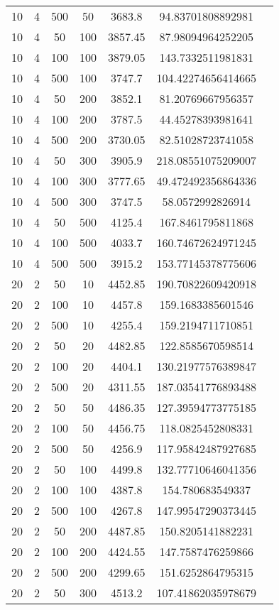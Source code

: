 {\begin{longtabu}{S
S
S
S
S
S[round-mode=places,round-precision=0]
S[round-mode=places,round-precision=0]}
10 & 4 & 500 & 50 & 3683.8 & 94.83701808892981 \\
10 & 4 & 50 & 100 & 3857.45 & 87.98094964252205 \\
10 & 4 & 100 & 100 & 3879.05 & 143.7332511981831 \\
10 & 4 & 500 & 100 & 3747.7 & 104.42274656414665 \\
10 & 4 & 50 & 200 & 3852.1 & 81.20769667956357 \\
10 & 4 & 100 & 200 & 3787.5 & 44.45278393981641 \\
10 & 4 & 500 & 200 & 3730.05 & 82.51028723741058 \\
10 & 4 & 50 & 300 & 3905.9 & 218.08551075209007 \\
10 & 4 & 100 & 300 & 3777.65 & 49.472492356864336 \\
10 & 4 & 500 & 300 & 3747.5 & 58.0572992826914 \\
10 & 4 & 50 & 500 & 4125.4 & 167.8461795811868 \\
10 & 4 & 100 & 500 & 4033.7 & 160.74672624971245 \\
10 & 4 & 500 & 500 & 3915.2 & 153.77145378775606 \\
20 & 2 & 50 & 10 & 4452.85 & 190.70822609420918 \\
20 & 2 & 100 & 10 & 4457.8 & 159.1683385601546 \\
20 & 2 & 500 & 10 & 4255.4 & 159.2194711710851 \\
20 & 2 & 50 & 20 & 4482.85 & 122.8585670598514 \\
20 & 2 & 100 & 20 & 4404.1 & 130.21977576389847 \\
20 & 2 & 500 & 20 & 4311.55 & 187.03541776893488 \\
20 & 2 & 50 & 50 & 4486.35 & 127.39594773775185 \\
20 & 2 & 100 & 50 & 4456.75 & 118.0825452808331 \\
20 & 2 & 500 & 50 & 4256.9 & 117.95842487927685 \\
20 & 2 & 50 & 100 & 4499.8 & 132.77710646041356 \\
20 & 2 & 100 & 100 & 4387.8 & 154.780683549337 \\
20 & 2 & 500 & 100 & 4267.8 & 147.99547290373445 \\
20 & 2 & 50 & 200 & 4487.85 & 150.8205141882231 \\
20 & 2 & 100 & 200 & 4424.55 & 147.7587476259866 \\
20 & 2 & 500 & 200 & 4299.65 & 151.6252864795315 \\
20 & 2 & 50 & 300 & 4513.2 & 107.41862035978679 \\

\end{longtabu}}

